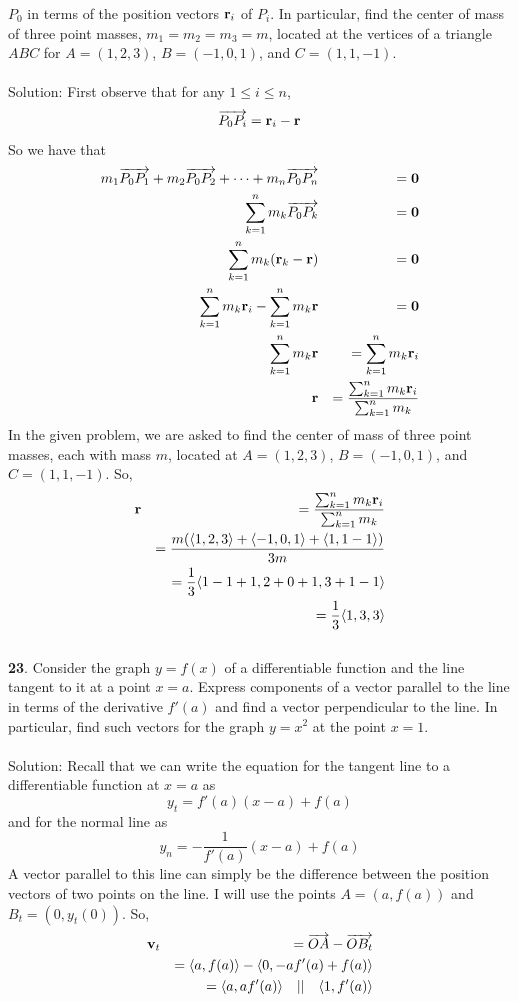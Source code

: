 \documentclass[12pt]{amsbook}
\newcommand{\la}{\langle}
\newcommand{\ra}{\rangle}
\begin{document}
$P_0$ in terms of the position vectors ${\bf r}_i$ of $P_i$.
In particular,
find the center of mass of three point masses, $m_1=m_2=m_3 =m$,
located at the vertices of a triangle $ABC$ for $A=(1,2,3)$,
$B=(-1,0,1)$, and $C=(1,1,-1)$.\\
\\ 
{\sc Solution}:
First observe that for any $1 \leq i \leq n$, 
$$\overrightarrow{P_0P_i}={\bf r}_i-{\bf r}$$
So we have that
\begin{eqnarray*}
m_1 \overrightarrow{P_0P_1}+m_2\overrightarrow{P_0P_2}
+\cdots+m_n\overrightarrow{P_0P_n}&&={\bf 0} \\
\sum_{k=1}^{n}m_k\overrightarrow{P_0P_k}&&=\bf 0 \\
\sum_{k=1}^{n}m_k({\bf r}_k-{\bf r})&&=\bf 0 \\
\sum_{k=1}^{n}m_k{\bf r}_i-\sum_{k=1}^{n}m_k{\bf r}&&=\bf 0 \\
\sum_{k=1}^{n}m_k{\bf r}&&=\sum_{k=1}^{n}m_k{\bf r}_i \\ 
{\bf r}&&=\frac{\sum_{k=1}^{n}m_k{\bf r}_i}{\sum_{k=1}^{n}m_k}
\end{eqnarray*}
In the given problem, we are asked to find the center of mass of three point masses, each with mass $m$, located at $A=(1,2,3)$, $B=(-1,0,1)$, and $C=(1,1,-1)$. So,
\begin{eqnarray*}
{\bf r}&&=\frac{\sum_{k=1}^{n}m_k{\bf r}_i}{\sum_{k=1}^{n}m_k} \\
&&=\frac{m(\la 1,2,3 \ra + \la -1,0,1 \ra + \la 1,1 -1 \ra)}{3m} \\
&&= \frac{1}{3}\la 1-1+1,2+0+1,3+1-1 \ra\\
&&=\frac{1}{3}\la 1,3,3 \ra
\end{eqnarray*}
\\
{\small\bf 23}. Consider the graph $y=f(x)$ of a differentiable 
function and the line tangent to it at a point $x=a$.
Express components of a vector parallel to the line
in terms of the derivative $f'(a)$ and find a vector perpendicular to the line. 
In particular, find such vectors for the graph $y=x^2$
at the point $x=1$. \\
\\ 
{\sc Solution}:
Recall that we can write the equation for the tangent line to a differentiable function at $x=a$ as
$$y_t=f'(a)(x-a)+f(a)$$
and for the normal line as 
$$y_n=-\frac{1}{f'(a)}(x-a)+f(a)$$
A vector parallel to this line can simply be the difference between the position vectors of two points on the line. I will use the points $A=(a,f(a))$ and $B_t=(0,y_t(0))$. So,
\begin{eqnarray*}
{\bf v}_t &&= \overrightarrow{OA}-\overrightarrow{OB_t} \\
&&= \la a,f(a) \ra - \la 0,-af'(a)+f(a) \ra \\
&&= \la a,af'(a) \ra \quad || \quad \la 1,f'(a) \ra
\end{eqnarray*}
\end{document}
